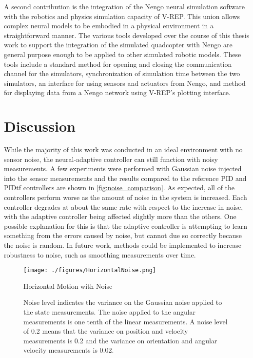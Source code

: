 \documentclass[letterpaper,12pt,titlepage,oneside,final]{book}
\begin{document}
A second contribution is the integration of the Nengo neural simulation software with the robotics and physics simulation capacity of V-REP.
This union allows complex neural models to be embodied in a physical environment in a straightforward manner.
The various tools developed over the course of this thesis work to support the integration of the simulated quadcopter with Nengo are general purpose enough to be applied to other simulated robotic models.
These tools include a standard method for opening and closing the communication channel for the simulators, synchronization of simulation time between the two simulators, an interface for using sensors and actuators from Nengo, and method for displaying data from a Nengo network using V-REP's plotting interface.


\section{Discussion}

While the majority of this work was conducted in an ideal environment with no sensor noise, the neural-adaptive controller can still function with noisy measurements.
A few experiments were performed with Gaussian noise injected into the sensor measurements and the results compared to the reference PID and PIDtf controllers are shown in \autoref{fig:noise_comparison}.
As expected, all of the controllers perform worse as the amount of noise in the system is increased.
Each controller degrades at about the same rate with respect to the increase in noise, with the adaptive controller being affected slightly more than the others.
One possible explanation for this is that the adaptive controller is attempting to learn something from the errors caused by noise, but cannot due so correctly because the noise is random.
In future work, methods could be implemented to increase robustness to noise, such as smoothing measurements over time.

\begin{figure}
\centering
\texttt{[image: ./figures/HorizontalNoise.png]}
\caption{Horizontal Motion with Noise}
\label{fig:noise_comparison}
\captionsetup{singlelinecheck=off,font=footnotesize}
\caption*{
Noise level indicates the variance on the Gaussian noise applied to the state measurements. The noise applied to the angular measurements is one tenth of the linear measurements. A noise level of 0.2 means that the variance on position and velocity measurements is 0.2 and the variance on orientation and angular velocity measurements is 0.02.}
\end{figure}
\end{document}
